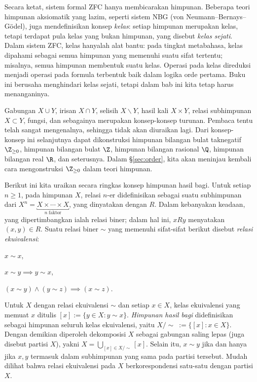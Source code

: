 Secara ketat, sistem formal ZFC hanya membicarakan himpunan. Beberapa teori himpunan aksiomatik yang lazim, seperti sistem NBG (von Neumann--Bernays--Gödel), juga mendefinisikan konsep \emph{kelas}: setiap himpunan merupakan kelas, tetapi terdapat pula kelas yang bukan himpunan, yang disebut \emph{kelas sejati}. Dalam sistem ZFC, kelas hanyalah alat bantu: pada tingkat metabahasa, kelas dipahami sebagai semua himpunan yang memenuhi suatu sifat tertentu; misalnya, semua himpunan membentuk suatu kelas. Operasi pada kelas direduksi menjadi operasi pada formula terbentuk baik dalam logika orde pertama. Buku ini berusaha menghindari kelas sejati, tetapi dalam bab ini kita tetap harus menanganinya.

Gabungan $X \cup Y$, irisan $X \cap Y$, selisih $X \smallsetminus Y$, hasil kali $X \times Y$, relasi subhimpunan $X \subset Y$, fungsi, dan sebagainya merupakan konsep-konsep turunan. Pembaca tentu telah sangat mengenalnya, sehingga tidak akan diuraikan lagi. Dari konsep-konsep ini selanjutnya dapat dikonstruksi himpunan bilangan bulat taknegatif $\Z_{\geq 0}$, himpunan bilangan bulat $\Z$, himpunan bilangan rasional $\Q$, himpunan bilangan real $\R$, dan seterusnya. Dalam \S\ref{sec:order}, kita akan meninjau kembali cara mengonstruksi $\Z_{\geq 0}$ dalam teori himpunan.

Berikut ini kita uraikan secara ringkas konsep himpunan hasil bagi. Untuk setiap $n \geq 1$, pada himpunan $X$, relasi $n$-er didefinisikan sebagai suatu subhimpunan dari $X^n = \underbracket{X \times \cdots \times X}_{n\; \text{faktor}}$, yang dinyatakan dengan $R$. Dalam kebanyakan keadaan, yang dipertimbangkan ialah relasi biner; dalam hal ini, $xRy$ menyatakan $(x,y) \in R$. Suatu relasi biner $\sim$ yang memenuhi sifat-sifat berikut disebut \emph{relasi ekuivalensi}:
\begin{compactdesc}
	\item[Refleksif] $x \sim x$,
	\item[Simetris] $x \sim y \implies y \sim x$,
	\item[Transitif] $(x \sim y) \wedge (y \sim z) \implies (x \sim z)$.
\end{compactdesc}
Untuk $X$ dengan relasi ekuivalensi $\sim$ dan setiap $x \in X$, kelas ekuivalensi yang memuat $x$ ditulis $[x] := \{y \in X: y \sim x \}$. \emph{Himpunan hasil bagi} didefinisikan sebagai himpunan seluruh kelas ekuivalensi, yaitu $X/\sim\; := \{[x] : x \in X \}$. Dengan demikian diperoleh dekomposisi $X$ sebagai gabungan saling lepas (juga disebut partisi $X$), yakni $X = \bigcup_{[x] \in X/\sim} [x]$. Selain itu, $x \sim y$ jika dan hanya jika $x,y$ termasuk dalam subhimpunan yang sama pada partisi tersebut. Mudah dilihat bahwa relasi ekuivalensi pada $X$ berkorespondensi satu-satu dengan partisi $X$.

